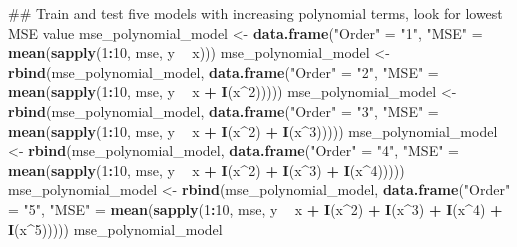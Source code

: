 \documentclass[]{article}
\newenvironment{Shaded}{\begin{snugshade}}{\end{snugshade}}
\newcommand{\KeywordTok}[1]{\textcolor[rgb]{0.13,0.29,0.53}{\textbf{#1}}}
\newcommand{\DecValTok}[1]{\textcolor[rgb]{0.00,0.00,0.81}{#1}}
\newcommand{\StringTok}[1]{\textcolor[rgb]{0.31,0.60,0.02}{#1}}
\newcommand{\OperatorTok}[1]{\textcolor[rgb]{0.81,0.36,0.00}{\textbf{#1}}}
\newcommand{\NormalTok}[1]{#1}
\begin{document}
\begin{Shaded}
\begin{Highlighting}[]
\NormalTok{## Train and test five models with increasing polynomial terms, look for lowest MSE value}
\NormalTok{mse_polynomial_model <-}\StringTok{ }\KeywordTok{data.frame}\NormalTok{(}\StringTok{"Order"}\NormalTok{ =}\StringTok{ "1"}\NormalTok{, }\StringTok{"MSE"}\NormalTok{ =}\StringTok{ }\KeywordTok{mean}\NormalTok{(}\KeywordTok{sapply}\NormalTok{(}\DecValTok{1}\OperatorTok{:}\DecValTok{10}\NormalTok{, mse, y }\OperatorTok{~}\StringTok{ }\NormalTok{x)))}
\NormalTok{mse_polynomial_model <-}\StringTok{ }\KeywordTok{rbind}\NormalTok{(mse_polynomial_model, }\KeywordTok{data.frame}\NormalTok{(}\StringTok{"Order"}\NormalTok{ =}\StringTok{ "2"}\NormalTok{, }\StringTok{"MSE"}\NormalTok{ =}\StringTok{ }\KeywordTok{mean}\NormalTok{(}\KeywordTok{sapply}\NormalTok{(}\DecValTok{1}\OperatorTok{:}\DecValTok{10}\NormalTok{, mse, y }\OperatorTok{~}\StringTok{ }\NormalTok{x }\OperatorTok{+}\StringTok{ }\KeywordTok{I}\NormalTok{(x}\OperatorTok{^}\DecValTok{2}\NormalTok{)))))}
\NormalTok{mse_polynomial_model <-}\StringTok{ }\KeywordTok{rbind}\NormalTok{(mse_polynomial_model, }\KeywordTok{data.frame}\NormalTok{(}\StringTok{"Order"}\NormalTok{ =}\StringTok{ "3"}\NormalTok{, }\StringTok{"MSE"}\NormalTok{ =}\StringTok{ }\KeywordTok{mean}\NormalTok{(}\KeywordTok{sapply}\NormalTok{(}\DecValTok{1}\OperatorTok{:}\DecValTok{10}\NormalTok{, mse, y }\OperatorTok{~}\StringTok{ }\NormalTok{x }\OperatorTok{+}\StringTok{ }\KeywordTok{I}\NormalTok{(x}\OperatorTok{^}\DecValTok{2}\NormalTok{) }\OperatorTok{+}\StringTok{ }\KeywordTok{I}\NormalTok{(x}\OperatorTok{^}\DecValTok{3}\NormalTok{)))))}
\NormalTok{mse_polynomial_model <-}\StringTok{ }\KeywordTok{rbind}\NormalTok{(mse_polynomial_model, }\KeywordTok{data.frame}\NormalTok{(}\StringTok{"Order"}\NormalTok{ =}\StringTok{ "4"}\NormalTok{, }\StringTok{"MSE"}\NormalTok{ =}\StringTok{ }\KeywordTok{mean}\NormalTok{(}\KeywordTok{sapply}\NormalTok{(}\DecValTok{1}\OperatorTok{:}\DecValTok{10}\NormalTok{, mse, y }\OperatorTok{~}\StringTok{ }\NormalTok{x }\OperatorTok{+}\StringTok{ }\KeywordTok{I}\NormalTok{(x}\OperatorTok{^}\DecValTok{2}\NormalTok{) }\OperatorTok{+}\StringTok{ }\KeywordTok{I}\NormalTok{(x}\OperatorTok{^}\DecValTok{3}\NormalTok{) }\OperatorTok{+}\StringTok{ }\KeywordTok{I}\NormalTok{(x}\OperatorTok{^}\DecValTok{4}\NormalTok{)))))}
\NormalTok{mse_polynomial_model <-}\StringTok{ }\KeywordTok{rbind}\NormalTok{(mse_polynomial_model, }\KeywordTok{data.frame}\NormalTok{(}\StringTok{"Order"}\NormalTok{ =}\StringTok{ "5"}\NormalTok{, }\StringTok{"MSE"}\NormalTok{ =}\StringTok{ }\KeywordTok{mean}\NormalTok{(}\KeywordTok{sapply}\NormalTok{(}\DecValTok{1}\OperatorTok{:}\DecValTok{10}\NormalTok{, mse, y }\OperatorTok{~}\StringTok{ }\NormalTok{x }\OperatorTok{+}\StringTok{ }\KeywordTok{I}\NormalTok{(x}\OperatorTok{^}\DecValTok{2}\NormalTok{) }\OperatorTok{+}\StringTok{ }\KeywordTok{I}\NormalTok{(x}\OperatorTok{^}\DecValTok{3}\NormalTok{) }\OperatorTok{+}\StringTok{ }\KeywordTok{I}\NormalTok{(x}\OperatorTok{^}\DecValTok{4}\NormalTok{) }\OperatorTok{+}\StringTok{ }\KeywordTok{I}\NormalTok{(x}\OperatorTok{^}\DecValTok{5}\NormalTok{)))))}
\NormalTok{mse_polynomial_model}
\end{Highlighting}
\end{Shaded}
\end{document}

